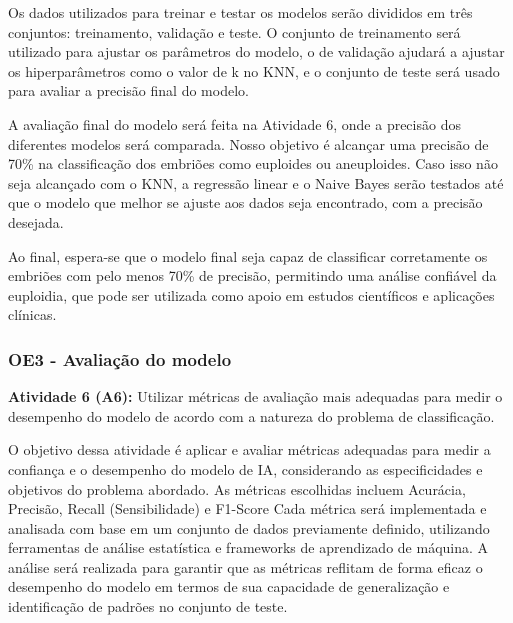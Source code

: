 Os dados utilizados para treinar e testar os modelos serão divididos em três conjuntos: treinamento, validação e teste. O conjunto de treinamento será utilizado para ajustar os parâmetros do modelo, o de validação ajudará a ajustar os hiperparâmetros como o valor de k no KNN, e o conjunto de teste será usado para avaliar a precisão final do modelo.

A avaliação final do modelo será feita na Atividade 6, onde a precisão dos diferentes modelos será comparada. Nosso objetivo é alcançar uma precisão de 70\% na classificação dos embriões como euploides ou aneuploides. Caso isso não seja alcançado com o KNN, a regressão linear e o Naive Bayes serão testados até que o modelo que melhor se ajuste aos dados seja encontrado, com a precisão desejada.

Ao final, espera-se que o modelo final seja capaz de classificar corretamente os embriões com pelo menos 70\% de precisão, permitindo uma análise confiável da euploidia, que pode ser utilizada como apoio em estudos científicos e aplicações clínicas.

\subsubsection{OE3 - Avaliação do modelo}

\textbf{Atividade 6 (A6):} Utilizar métricas de avaliação mais adequadas para medir o desempenho do modelo de acordo com a natureza do problema de classificação.

O objetivo dessa atividade é aplicar e avaliar métricas adequadas para medir a confiança e o desempenho do modelo de IA, considerando as especificidades e objetivos do problema abordado. As métricas escolhidas incluem Acurácia, Precisão, Recall (Sensibilidade) e F1-Score Cada métrica será implementada e analisada com base em um conjunto de dados previamente definido, utilizando ferramentas de análise estatística e frameworks de aprendizado de máquina. A análise será realizada para garantir que as métricas reflitam de forma eficaz o desempenho do modelo em termos de sua capacidade de generalização e identificação de padrões no conjunto de teste.

